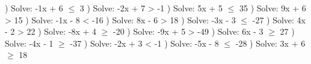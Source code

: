 \documentclass{article}%
\begin{document}
) Solve: -1x + 6 $\leq$ 3%
\newline%
\newline%
) Solve: -2x + 7 > -1%
\newline%
\newline%
) Solve: 5x + 5 $\leq$ 35%
\newline%
\newline%
) Solve: 9x + 6 > 15%
\newline%
\newline%
) Solve: -1x - 8 < -16%
\newline%
\newline%
) Solve: 8x - 6 > 18%
\newline%
\newline%
) Solve: -3x - 3 $\leq$ -27%
\newline%
\newline%
) Solve: 4x - 2 > 22%
\newline%
\newline%
) Solve: -8x + 4 $\geq$ -20%
\newline%
\newline%
) Solve: -9x + 5 > -49%
\newline%
\newline%
) Solve: 6x - 3 $\geq$ 27%
\newline%
\newline%
) Solve: -4x - 1 $\geq$ -37%
\newline%
\newline%
) Solve: -2x + 3 < -1%
\newline%
\newline%
) Solve: -5x - 8 $\leq$ -28%
\newline%
\newline%
) Solve: 3x + 6 $\geq$ 18%
\newline%
\end{document}
